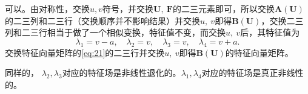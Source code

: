 \documentclass[12pt]{article}
\begin{document}
可以。由对称性，交换$u,v$符号，并交换$\bm{U},\ \bm{F}$的二三元素即可，所以交换$\bm{A}(\bm{U})$的二三列和二三行（交换顺序并不影响结果）并交换$u,\ v$即得$\bm{B}(\bm{U})$，交换二三列和二三行相当于做了一个相似变换，特征值不变，而交换$u,\ v$后，其特征值为
\begin{equation}
	\lambda_1 = v-a,\quad\lambda_2 = v,\quad\lambda_3 = v,\quad\lambda_4 = v+a.
\end{equation}
交换特征向量矩阵的\cref{eq:21}的二三行并交换$u,\ v$即得$\bm{B}(\bm{U})$的特征向量矩阵。

同样的， $\lambda_2,\lambda_3$对应的特征场是非线性退化的。$\lambda_1,\lambda_4$对应的特征场是真正非线性的。





\end{document}
